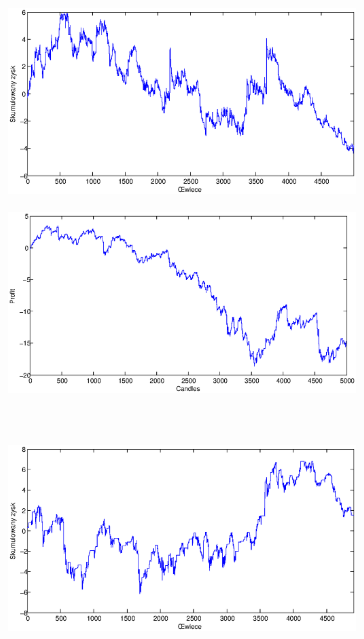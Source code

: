 \begin{figure}[h]
\centering
\begin{minipage}{.49\linewidth}
\centering
\includegraphics[width=0.82\textwidth]{images/S1a_eurjpy.eps}
\label{jedno}
\end{minipage}
\begin{minipage}{.49\linewidth}
\centering
\includegraphics[width=0.82\textwidth]{images/S1b_eurjpy.eps}
\label{dwu}
\end{minipage}
\\
\begin{minipage}{.49\linewidth}
\centering
\includegraphics[width=0.82\textwidth]{images/S1c_eurjpy.eps}
\label{cztero}
\end{minipage}
\begin{minipage}{.49\linewidth}

\end{minipage}
\end{figure}
